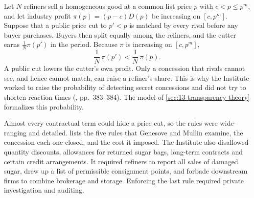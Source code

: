\begin{remark}\label{rem:13-moves}
Let $N$ refiners sell a homogeneous good at a common list price $p$ with $c < p \le p^m$, and let industry profit
$\pi(p) = (p - c)D(p)$ be increasing on $[c, p^m]$. Suppose that a public price cut to $p' < p$ is matched by
every rival before any buyer purchases. Buyers then split equally among the refiners, and the cutter earns
$\frac{1}{N}\pi(p')$ in the period. Because $\pi$ is increasing on $[c, p^m]$,
\begin{equation*}
  \frac{1}{N}\,\pi(p') < \frac{1}{N}\,\pi(p) .
\end{equation*}
A public cut lowers the cutter's own profit. Only a concession that rivals cannot see, and hence cannot match,
can raise a refiner's share. This is why the Institute worked to raise the probability of detecting secret
concessions and did not try to shorten reaction times (\citealp{GenesoveMullin2001}, pp.~383--384). The
model of \cref{sec:13-transparency-theory} formalizes this probability.
\end{remark}

Almost every contractual term could hide a price cut, so the rules were wide-ranging and detailed.
 lists the five rules that Genesove and Mullin examine, the concession each one closed, and
the cost it imposed. The Institute also disallowed quantity discounts, allowances for returned sugar bags,
long-term contracts and certain credit arrangements. It required refiners to report all sales of damaged sugar,
drew up a list of permissible consignment points, and forbade downstream firms to combine brokerage and storage.
Enforcing the last rule required private investigation and auditing.

